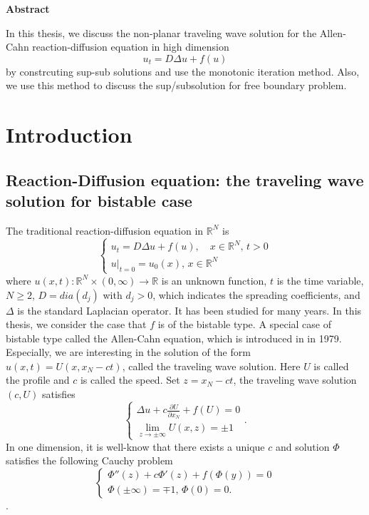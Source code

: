 \documentclass[12pt, a4paper]{article}
\numberwithin{equation}{section}
\newcommand{\R}{\mathbb{R}}
\newcommand{\pd}[2]{\frac{\partial #1}{\partial #2}}
\begin{document}
\begin{CJK}{UTF8}{bkai}
	
	\begin{center}\bf Abstract \end{center}
		In this thesis, we  discuss the non-planar traveling wave solution for the Allen-Cahn reaction-diffusion equation in  high dimension
	\[
		u_t=D\Delta u+f(u)
	\]
	by constrcuting  sup-sub solutions and use the monotonic iteration method. Also, we use this method to discuss the sup/subsolution for free boundary problem.
\clearpage
	
	\thispagestyle{empty}
	\renewcommand\contentsname{目錄 Contents}
	\tableofcontents
	
	\clearpage
	
	\setcounter{page}{1}




\section{Introduction}
\subsection{Reaction-Diffusion equation: the traveling wave solution for bistable case}
	The traditional reaction-diffusion equation in $\R^N$ is
\begin{equation}
\begin{cases}
	u_t=D\Delta u+f(u),\quad x\in\R^N,\,t>0\\
	u\big|_{t=0}=u_0(x),\,x\in\R^N
\end{cases}
\end{equation}
where $u(x,t):\R^N\times(0,\infty)\to\R$ is an unknown function, $t$ is the time variable, $N\geq 2$, $D=dia(d_j)$ with $d_j>0$, which indicates the spreading coefficients, and $\Delta$ is the standard Laplacian operator. It has been studied for many years. In this thesis, we consider the case that $f$ is of the bistable type. A special case of bistable type called the Allen-Cahn equation, which is introduced in \cite{AC1979} in 1979. Especially, we are interesting in the solution of the form $u(x,t)=U(x,x_N-ct)$, called the traveling wave solution. Here $U$ is called the profile and $c$ is called the speed. Set $z=x_N-ct$, the traveling wave solution $(c,U)$ satisfies
\begin{equation}\label{iden1.2}
\begin{cases}
	\Delta u+c\pd{U}{x_N}+f(U)=0\\
	\lim\limits_{z\to\pm\infty}U(x,z)=\pm1
\end{cases}.
\end{equation}
In one dimension, it is well-know that there exists a unique $c$ and solution $\Phi$ satisfies the following Cauchy problem
\[
\begin{cases}
	\Phi''(z)+c\Phi'(z)+f(\Phi(y))=0\\
	\Phi(\pm\infty)=\mp1,\,\Phi(0)=0.
\end{cases}
\].
	

\end{CJK}
\end{document}
